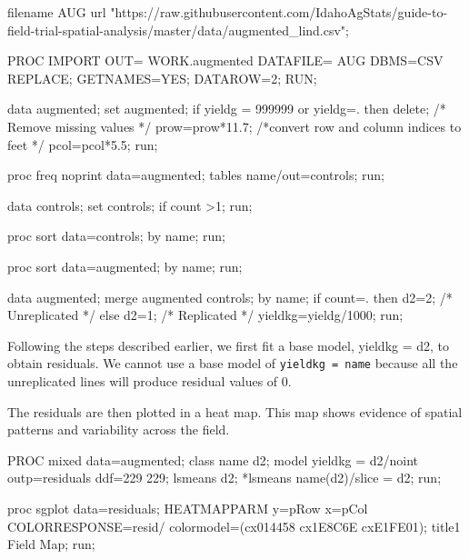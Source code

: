 \documentclass[
]{book}
\newenvironment{Shaded}{\begin{snugshade}}{\end{snugshade}}
\newcommand{\NormalTok}[1]{#1}
\begin{document}
\begin{Shaded}
\begin{Highlighting}[]
\NormalTok{filename AUG url "https://raw.githubusercontent.com/IdahoAgStats/guide{-}to{-}field{-}trial{-}spatial{-}analysis/master/data/augmented\_lind.csv";}

\NormalTok{PROC IMPORT OUT= WORK.augmented}
\NormalTok{     DATAFILE= AUG}
\NormalTok{     DBMS=CSV REPLACE;}
\NormalTok{     GETNAMES=YES;}
\NormalTok{     DATAROW=2; }
\NormalTok{RUN;}

\NormalTok{data augmented;}
\NormalTok{    set augmented;}
\NormalTok{    if yieldg = 999999 or yieldg=. then delete; /* Remove missing values */}
\NormalTok{    prow=prow*11.7; /*convert row and column indices to feet */}
\NormalTok{    pcol=pcol*5.5;}
\NormalTok{run;}

\NormalTok{proc freq noprint data=augmented;}
\NormalTok{    tables name/out=controls;}
\NormalTok{run;}

\NormalTok{data controls;}
\NormalTok{    set controls;}
\NormalTok{    if count \textgreater{}1;}
\NormalTok{run;}

\NormalTok{proc sort data=controls;}
\NormalTok{    by name;}
\NormalTok{run;}
     
\NormalTok{proc sort data=augmented;}
\NormalTok{    by name;}
\NormalTok{run;}

\NormalTok{data augmented;}
\NormalTok{    merge augmented controls;}
\NormalTok{    by name;}
\NormalTok{    if count=. then d2=2; /* Unreplicated */}
\NormalTok{    else d2=1;            /* Replicated */}
\NormalTok{    yieldkg=yieldg/1000;}
\NormalTok{run;}
\end{Highlighting}
\end{Shaded}

Following the steps described earlier, we first fit a base model, yieldkg = d2, to obtain residuals. We cannot use a base model of \texttt{yieldkg\ =\ name} because all the unreplicated lines will produce residual values of 0.

The residuals are then plotted in a heat map. This map shows evidence of spatial patterns and variability across the field.

\begin{Shaded}
\begin{Highlighting}[]
\NormalTok{PROC mixed data=augmented;}
\NormalTok{    class name d2;}
\NormalTok{    model yieldkg = d2/noint outp=residuals ddf=229 229;}
\NormalTok{    lsmeans d2;}
\NormalTok{    *lsmeans name(d2)/slice = d2;}
\NormalTok{run;}

\NormalTok{proc sgplot data=residuals;}
\NormalTok{    HEATMAPPARM y=pRow x=pCol COLORRESPONSE=resid/ colormodel=(cx014458 cx1E8C6E cxE1FE01); }
\NormalTok{title1 \textquotesingle{}Field Map\textquotesingle{};}
\NormalTok{run;}
\end{Highlighting}
\end{Shaded}
\end{document}
